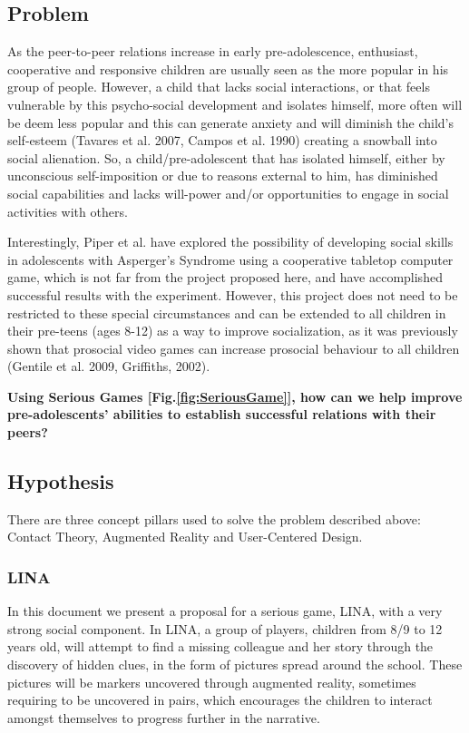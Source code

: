 \documentclass[runningheads]{llncs}
\begin{document}
\subsection{Problem}

\par As the peer-to-peer relations increase in early pre-adolescence, enthusiast, cooperative and responsive children are usually seen as the more popular in his group of people. However, a child that lacks social interactions, or that feels vulnerable by this psycho-social development and isolates himself, more often will be deem less popular and this can generate anxiety and will diminish the child's self-esteem (Tavares et al. 2007, Campos et al. 1990) creating a snowball into social alienation. So, a child/pre-adolescent that has isolated himself, either by unconscious self-imposition or due to reasons external to him, has diminished social capabilities and lacks will-power and/or opportunities to engage in social activities with others. 
 
\par Interestingly, Piper et al. have explored the possibility of developing social skills in adolescents with Asperger's Syndrome using a cooperative tabletop computer game, which is not far from the project proposed here, and have accomplished successful results with the experiment. However, this project does not need to be restricted to these special circumstances and can be extended to all children in their pre-teens (ages 8-12) as a way to improve socialization, as it was previously shown that prosocial video games can increase prosocial behaviour to all children (Gentile et al. 2009, Griffiths, 2002).
\par \textbf{Using Serious Games [Fig.\ref{fig:SeriousGame}], how can we help improve pre-adolescents' abilities to establish successful relations with their peers?}




\subsection{Hypothesis}

\par There are three concept pillars used to solve the problem described above: Contact Theory, Augmented Reality and User-Centered Design.

\subsubsection{LINA}
\par In this document we present a proposal for a serious game, LINA, with a very strong social component. In LINA, a group of players, children from 8/9 to 12 years old, will attempt to find a missing colleague and her story through the discovery of hidden clues, in the form of pictures spread around the school. These pictures will be markers uncovered through augmented reality, sometimes requiring to be uncovered in pairs, which encourages the children to interact amongst themselves to progress further in the narrative.
\end{document}
